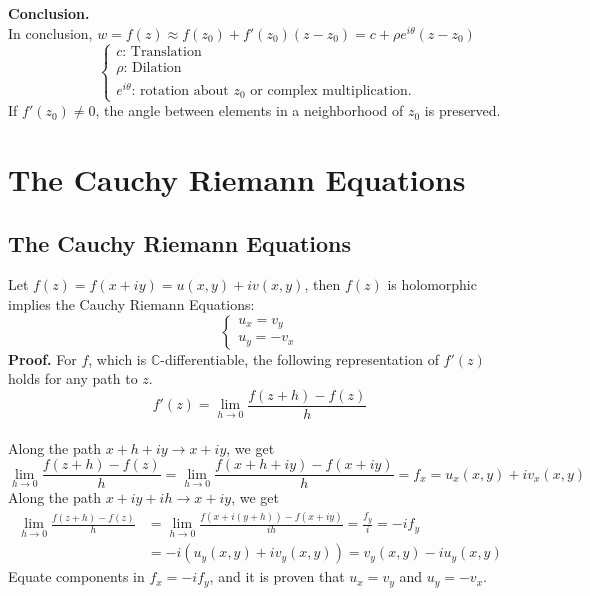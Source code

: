 \documentclass[11pt]{article}
\begin{document}
\textbf{Conclusion.} \\
In conclusion, $w = f(z) \approx f(z_0) + f'(z_0)(z - z_0) = c + \rho e^{i\theta}(z - z_0)$ \\
\[ \begin{cases} 
c\mbox{: Translation }\\
\rho \mbox{: Dilation }\\
e^{i\theta} \mbox{: rotation about $z_0$ or complex multiplication. }
   \end{cases}
\]
If $f'(z_0) \neq 0$, the angle between elements in a neighborhood of $z_0$ is preserved. 
\newpage
\section{The Cauchy Riemann Equations}
\subsection{The Cauchy Riemann Equations}
Let $f(z) = f(x + iy) = u(x, y) + iv(x, y)$, then $f(z)$ is holomorphic implies the Cauchy Riemann Equations: 
\[ \begin{cases} 
	u_x = v_y \\
	u_y = -v_x
   \end{cases}
\]
\textbf{Proof.}
For $f$, which is $\mathbb{C}$-differentiable, the following representation of $f'(z)$ holds for any path to $z$. 
$$f'(z) = \lim_{h \to 0} \frac{f(z + h) - f(z)}{h}$$
\\
Along the path $x + h + iy \to x + iy$, we get 
$$\lim_{h \to 0} \frac{f(z + h) - f(z)}{h} = \lim_{h \to 0} \frac{f(x + h + iy) - f(x + iy)}{h} = f_x = u_x(x,y) + iv_x(x, y)$$
Along the path $x + iy +ih \to x + iy$, we get 
\begin{align*}
\lim_{h \to 0} \frac{f(z + h) - f(z)}{h} &= \lim_{h \to 0} \frac{f(x + i(y + h)) - f(x + iy)}{ih} = \frac{f_y}{i} = -if_y \\
&= -i(u_y(x,y) + iv_y(x, y)) = v_y(x, y) -iu_y(x, y)
\end{align*}
Equate components in $f_x = -if_y$, and it is proven that $u_x = v_y$ and $u_y = -v_x$. \\
\end{document}
